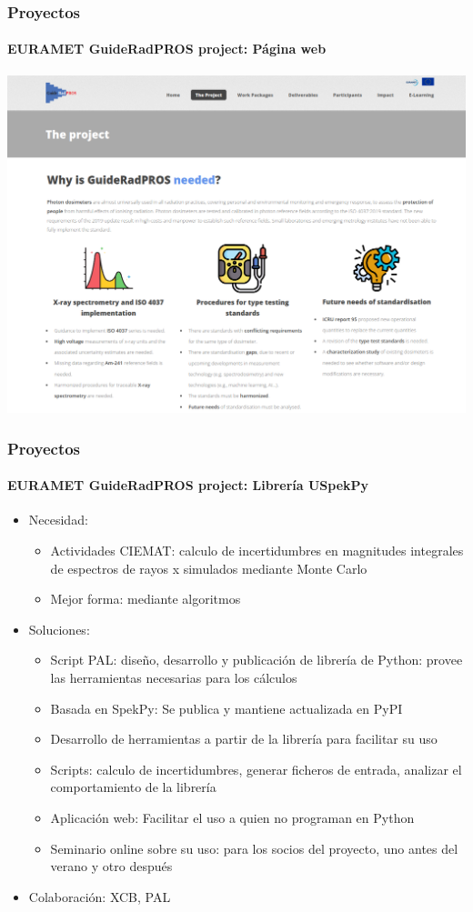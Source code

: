 \documentclass{beamer}
\newcommand{\highlight}[1]{{\color{blue} #1}}
\begin{document}
	\begin{frame}
		\frametitle{Proyectos}
		\framesubtitle{EURAMET GuideRadPROS project: Página web}
		\centering
		\includegraphics[width=\textwidth]{GRP_website}
	\end{frame}
	
	\begin{frame}
		\frametitle{Proyectos}
		\framesubtitle{EURAMET GuideRadPROS project: Librería USpekPy}
		\begin{itemize}
			\item Necesidad: 
			\begin{itemize}
				\item \highlight{Actividades CIEMAT}: calculo de incertidumbres en magnitudes integrales de espectros de rayos x simulados mediante Monte Carlo
				\item Mejor forma: mediante algoritmos
			\end{itemize}
			\item Soluciones:
			\begin{itemize}
				\item \highlight{Script PAL}: diseño, desarrollo y publicación de librería de Python: provee las herramientas necesarias para los cálculos
				\item Basada en \highlight{SpekPy}: Se publica y mantiene actualizada en PyPI
				\item Desarrollo de herramientas a partir de la librería para facilitar su uso
				\item \highlight{Scripts}: calculo de incertidumbres, generar ficheros de entrada, analizar el comportamiento de la librería
				\item \highlight{Aplicación web}: Facilitar el uso a quien no programan en Python
				\item \highlight{Seminario online} sobre su uso: para los socios del proyecto, uno antes del verano y otro después
			\end{itemize}
			\item Colaboración: XCB, PAL
		\end{itemize}
	\end{frame}
	
\end{document}
